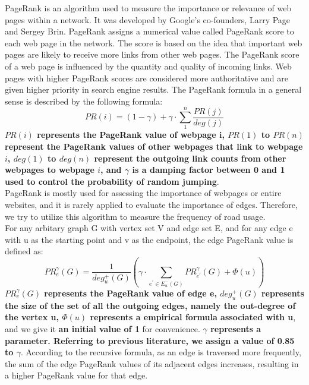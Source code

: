 \indent\indent PageRank is an algorithm used to measure the importance or relevance of web pages within a network. It was developed by Google's co-founders, Larry Page and Sergey Brin. PageRank assigns a numerical value called PageRank score to each web page in the network. The score is based on the idea that important web pages are likely to receive more links from other web pages. The PageRank score of a web page is influenced by the quantity and quality of incoming links. Web pages with higher PageRank scores are considered more authoritative and are given higher priority in search engine results. The PageRank formula in a general sense is described by the following formula:
\begin{equation*}
    PR(i)=(1-\gamma)+\gamma \cdot \sum_{1}^{n} \frac{PR(j)}{deg(j)}
\end{equation*}
\indent \textbf{$PR(i)$ represents the PageRank value of webpage i, $PR(1)$ to $PR(n)$ represent the PageRank values of other webpages that link to webpage $i$, $deg(1)$ to $deg(n)$ represent the outgoing link counts from other webpages to webpage $i$, and $\gamma$ is a damping factor between 0 and 1 used to control the probability of random jumping}.\\
\indent PageRank is mostly used for assessing the importance of webpages or entire websites, and it is rarely applied to evaluate the importance of edges. Therefore, we try to utilize this algorithm to measure the frequency of road usage. \\
\indent For any arbitary graph G with vertex set V and edge set E, and for any edge e with u as the starting point and v as the endpoint, the edge PageRank value is defined as:
\begin{equation*}
    PR^{\gamma}_e(G)= \frac{1}{deg^{+}_u(G)}( \gamma\cdot\sum_{e^{\prime}\in E^-_u(G)}^{}PR^{\gamma}_{e^{\prime}}(G)+\Phi(u))
\end{equation*}
\indent \textbf{$PR^{\gamma}_e(G)$ represents the PageRank value of edge e, $deg^{+}_u(G)$ represents the size of the set of all the outgoing edges, namely the out-degree of the vertex u, $\Phi(u)$ represents a empirical formula associated with u}, and we give it \textbf{an initial value of 1} for convenience. \textbf{$\gamma$ represents a parameter. Referring to previous literature, we assign a value of 0.85 to $\gamma$}. According to the recursive formula, as an edge is traversed more frequently, the sum of the edge PageRank values of its adjacent edges increases, resulting in a higher PageRank value for that edge.\\
